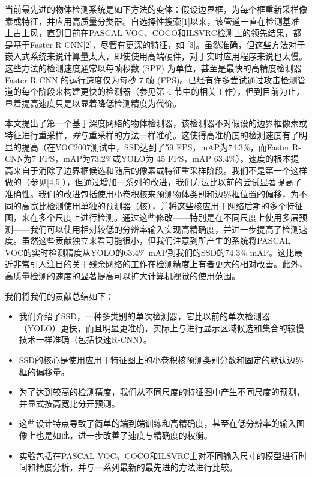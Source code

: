 \documentclass[../main.tex]{subfile}
\begin{document}
当前最先进的物体检测系统是如下方法的变体：假设边界框，为每个框重新采样像素或特征，并应用高质量分类器。自选择性搜索[1]以来，该管道一直在检测基准上占上风，直到目前在PASCAL VOC、COCO和ILSVRC检测上的领先结果，都是基于Faster R-CNN[2]，尽管有更深的特征，如 [3]。虽然准确，但这些方法对于嵌入式系统来说计算量太大，即使使用高端硬件，对于实时应用程序来说也太慢。这些方法的检测速度通常以每帧秒数 (SPF) 为单位，甚至是最快的高精度检测器 Faster R-CNN 的运行速度仅为每秒 7 帧 (FPS)。已经有许多尝试通过攻击检测管道的每个阶段来构建更快的检测器（参见第 4 节中的相关工作），但到目前为止，显着提高速度只是以显着降低检测精度为代价。

本文提出了第一个基于深度网络的物体检测器，该检测器不对假设的边界框像素或特征进行重采样，\textit{并}与重采样的方法一样准确。这使得高准确度的检测速度有了明显的提高（在VOC2007测试中，SSD达到了59 FPS，mAP为74.3\%，而Faster R-CNN为7 FPS，mAP为73.2\%或YOLO为 45 FPS，mAP 63.4\%）。速度的根本提高来自于消除了边界框候选和随后的像素或特征重采样阶段。我们不是第一个这样做的（参见[4,5]），但通过增加一系列的改进，我们方法比以前的尝试显著提高了准确性。我们的改进包括使用小卷积核来预测物体类别和边界框位置的偏移，为不同的高宽比检测使用单独的预测器（核），并将这些核应用于网络后期的多个特征图，来在多个尺度上进行检测。通过这些修改——特别是在不同尺度上使用多层预测——我们可以使用相对较低的分辨率输入实现高精确度，并进一步提高了检测速度。虽然这些贡献独立来看可能很小，但我们注意到所产生的系统将PASCAL VOC的实时检测精度从YOLO的63.4\% mAP到我们的SSD的74.3\% mAP。这比最近非常引人注目的关于残余网络\cite{resnet}的工作在检测精度上有者更大的相对改善。此外，高质量检测的速度的显著提高可以扩大计算机视觉的使用范围。

我们将我们的贡献总结如下：
\begin{itemize}
    \item 我们介绍了SSD，一种多类别的单次检测器，它比以前的单次检测器（YOLO）更快，而且明显更准确，实际上与进行显示区域候选和集合的较慢技术一样准确（包括快速R-CNN）。
    \item SSD的核心是使用应用于特征图上的小卷积核预测类别分数和固定的默认边界框的偏移量。
    \item 为了达到较高的检测精度，我们从不同尺度的特征图中产生不同尺度的预测，并显式按高宽比分开预测。
    \item 这些设计特点导致了简单的端到端训练和高精确度，甚至在低分辨率的输入图像上也是如此，进一步改善了速度与精确度的权衡。
    \item 实验包括在PASCAL VOC、COCO和ILSVRC上对不同输入尺寸的模型进行时间和精度分析，并与一系列最新的最先进的方法进行比较。
\end{itemize}
\end{document}
